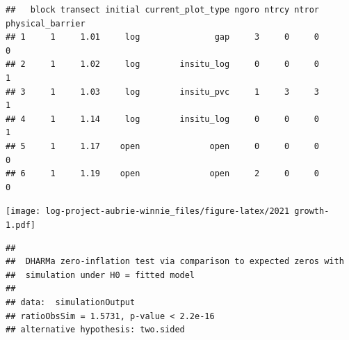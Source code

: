 \documentclass[
]{article}
\newenvironment{Shaded}{\begin{snugshade}}{\end{snugshade}}
\newcommand{\AttributeTok}[1]{\textcolor[rgb]{0.13,0.29,0.53}{#1}}
\newcommand{\CommentTok}[1]{\textcolor[rgb]{0.56,0.35,0.01}{\textit{#1}}}
\newcommand{\DecValTok}[1]{\textcolor[rgb]{0.00,0.00,0.81}{#1}}
\newcommand{\FunctionTok}[1]{\textcolor[rgb]{0.13,0.29,0.53}{\textbf{#1}}}
\newcommand{\NormalTok}[1]{#1}
\newcommand{\OtherTok}[1]{\textcolor[rgb]{0.56,0.35,0.01}{#1}}
\newcommand{\SpecialCharTok}[1]{\textcolor[rgb]{0.81,0.36,0.00}{\textbf{#1}}}
\newcommand{\StringTok}[1]{\textcolor[rgb]{0.31,0.60,0.02}{#1}}
\begin{document}
\begin{verbatim}
##   block transect initial current_plot_type ngoro ntrcy ntror physical_barrier
## 1     1     1.01     log               gap     3     0     0                0
## 2     1     1.02     log        insitu_log     0     0     0                1
## 3     1     1.03     log        insitu_pvc     1     3     3                1
## 4     1     1.14     log        insitu_log     0     0     0                1
## 5     1     1.17    open              open     0     0     0                0
## 6     1     1.19    open              open     2     0     0                0
\end{verbatim}

\begin{Shaded}
\end{Shaded}

\texttt{[image: log-project-aubrie-winnie\_files/figure-latex/2021 growth-1.pdf]}

\begin{verbatim}
## 
##  DHARMa zero-inflation test via comparison to expected zeros with
##  simulation under H0 = fitted model
## 
## data:  simulationOutput
## ratioObsSim = 1.5731, p-value < 2.2e-16
## alternative hypothesis: two.sided
\end{verbatim}
\end{document}
